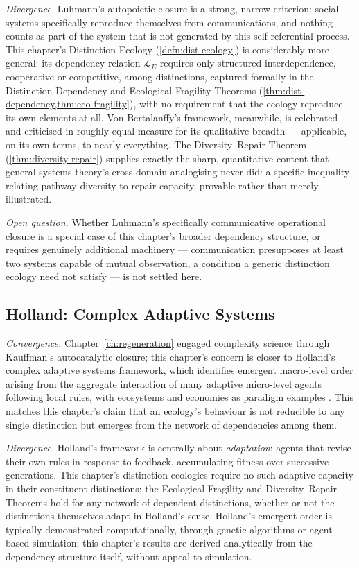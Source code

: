 \documentclass[12pt,twoside,openright]{book}
\begin{document}
\emph{Divergence.} Luhmann's autopoietic closure is a strong,
narrow criterion: social systems specifically reproduce
themselves from communications, and nothing counts as part of
the system that is not generated by this self-referential
process. This chapter's Distinction Ecology
(\cref{defn:dist-ecology}) is considerably more general: its
dependency relation $\mathcal{L}_E$ requires only structured
interdependence, cooperative or competitive, among
distinctions, captured formally in the Distinction Dependency
and Ecological Fragility Theorems
(\cref{thm:dist-dependency,thm:eco-fragility}), with no
requirement that the ecology reproduce its own elements at all.
Von Bertalanffy's framework, meanwhile, is celebrated and
criticised in roughly equal measure for its qualitative
breadth --- applicable, on its own terms, to nearly everything.
The Diversity--Repair Theorem (\cref{thm:diversity-repair})
supplies exactly the sharp, quantitative content that general
systems theory's cross-domain analogising never did: a specific
inequality relating pathway diversity to repair capacity,
provable rather than merely illustrated.

\emph{Open question.} Whether Luhmann's specifically
communicative operational closure is a special case of this
chapter's broader dependency structure, or requires genuinely
additional machinery --- communication presupposes at least two
systems capable of mutual observation, a condition a generic
distinction ecology need not satisfy --- is not settled here.

\subsection*{Holland: Complex Adaptive Systems}

\emph{Convergence.} Chapter~\ref{ch:regeneration} engaged
complexity science through Kauffman's autocatalytic closure;
this chapter's concern is closer to Holland's complex adaptive
systems framework, which identifies emergent macro-level order
arising from the aggregate interaction of many adaptive
micro-level agents following local rules, with ecosystems and
economies as paradigm examples \parencite{holland1995}. This
matches this chapter's claim that an ecology's behaviour is not
reducible to any single distinction but emerges from the
network of dependencies among them.

\emph{Divergence.} Holland's framework is centrally about
\emph{adaptation}: agents that revise their own rules in
response to feedback, accumulating fitness over successive
generations. This chapter's distinction ecologies require no
such adaptive capacity in their constituent distinctions; the
Ecological Fragility and Diversity--Repair Theorems hold for any
network of dependent distinctions, whether or not the
distinctions themselves adapt in Holland's sense. Holland's
emergent order is typically demonstrated computationally, through
genetic algorithms or agent-based simulation; this chapter's
results are derived analytically from the dependency structure
itself, without appeal to simulation.
\end{document}
